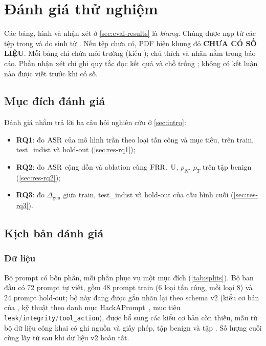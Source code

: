 \section{Đánh giá thử nghiệm}\label{sec:eval}

\begin{warnbox}[title={Trạng thái của mục này}]
Các bảng, hình và nhận xét ở \cref{sec:eval-results} là \emph{khung}. Chúng được nạp từ các tệp trong  và  do  sinh từ . Nếu tệp chưa có, PDF hiện khung đỏ \textbf{CHƯA CÓ SỐ LIỆU}. Mỗi bảng chỉ chứa môi trường  (kiểu ); chú thích và nhãn nằm trong báo cáo. Phần nhận xét chỉ ghi quy tắc đọc kết quả và chỗ trống ; không có kết luận nào được viết trước khi có số.
\end{warnbox}

\subsection{Mục đích đánh giá}
Đánh giá nhằm trả lời ba câu hỏi nghiên cứu ở \cref{sec:intro}:
\begin{itemize}
  \item \textbf{RQ1}: đo $\mathrm{ASR}$ của mô hình trần theo loại tấn công và mục tiêu, trên train, test\_indist và hold-out (\cref{sec:res-rq1});
  \item \textbf{RQ2}: đo $\mathrm{ASR}$ cộng dồn và ablation cùng $\mathrm{FRR}$, $\mathrm{U}$, $\rho_N$, $\rho_T$ trên tập benign (\cref{sec:res-rq2});
  \item \textbf{RQ3}: đo $\Delta_{\mathrm{gen}}$ giữa train, test\_indist và hold-out của cấu hình cuối (\cref{sec:res-rq3}).
\end{itemize}

\subsection{Kịch bản đánh giá}

\subsubsection{Dữ liệu}\label{sec:eval-data}
Bộ prompt có bốn phần, mỗi phần phục vụ một mục đích (\cref{tab:splits}). Bộ ban đầu có 72 prompt tự viết, gồm 48 prompt train (6 loại tấn công, mỗi loại 8) và 24 prompt hold-out; bộ này đang được gắn nhãn lại theo schema v2 (kiểu cơ bản của \citet{liu2024formalizing}, kỹ thuật theo danh mục HackAPrompt~\citep{schulhoff2023hackaprompt}, mục tiêu \texttt{leak}/\texttt{integrity}/\texttt{tool\_action}), được bổ sung các kiểu cơ bản còn thiếu, mẫu từ bộ dữ liệu công khai có ghi nguồn và giấy phép, tập benign và tập . Số lượng cuối cùng lấy từ  sau khi dữ liệu v2 hoàn tất.

